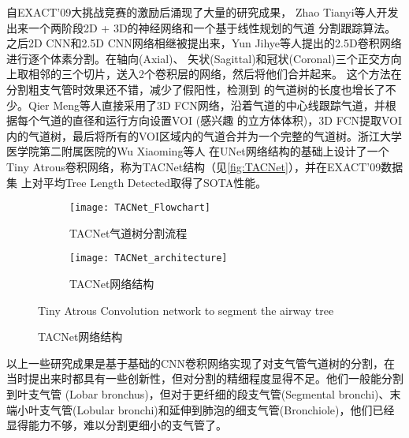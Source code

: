 	自EXACT'09大挑战竞赛的激励后涌现了大量的研究成果， Zhao Tianyi等人\cite{Zhao2019BronchusSA}开发出来一个两阶段2D + 3D的神经网络和一个基于线性规划的气道
	分割跟踪算法。之后2D CNN和2.5D CNN网络相继被提出来，Yun Jihye等人\cite{YUN201913}提出的2.5D卷积网络进行逐个体素分割。在轴向(Axial)、
	矢状(Sagittal)和冠状(Coronal)三个正交方向上取相邻的三个切片，送入2个卷积层的网络，然后将他们合并起来。 这个方法在分割粗支气管时效果还不错，减少了假阳性，检测到
	的气道树的长度也增长了不少。Qier Meng等人\cite{Meng2017TrackingAS}直接采用了3D FCN网络，沿着气道的中心线跟踪气道，并根据每个气道的直径和运行方向设置VOI
	(感兴趣	的立方体体积)，3D FCN提取VOI内的气道树，最后将所有的VOI区域内的气道合并为一个完整的气道树。浙江大学医学院第二附属医院的Wu Xiaoming等人
	\cite{Wu2021TACNet}在UNet网络结构的基础上设计了一个Tiny Atrous卷积网络，称为TACNet\cite{Wu2021TACNet}结构（见\autoref{fig:TACNet}），并在EXACT'09数据集
	上对平均Tree Length Detected取得了SOTA性能。
	\begin{figure}[!htp]
		\centering
		\begin{subfigure}{0.9\textwidth}
			\centering
			\texttt{[image: TACNet\_Flowchart]}
			\caption{TACNet气道树分割流程}
		\end{subfigure}
		\vfill
		\begin{subfigure}{0.9\textwidth}
			\centering
			\texttt{[image: TACNet\_architecture]}
			\caption{TACNet网络结构}
		\end{subfigure}
			{Tiny Atrous Convolution network to segment the airway tree}
		\label{fig:TACNet}
	\end{figure}
	
	以上一些研究成果是基于基础的CNN卷积网络实现了对支气管气道树的分割，在当时提出来时都具有一些创新性，但对分割的精细程度显得不足。他们一般能分割到叶支气管
	(Lobar bronchus)，但对于更纤细的段支气管(Segmental bronchi)、末端小叶支气管(Lobular bronchi)和延伸到肺泡的细支气管(Bronchiole)，他们已经显得能力不够，难以分割更细小的支气管了。
	
